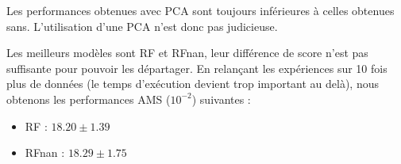\documentclass[12pt]{article}
\begin{document}
\begin{table}[H]
    \center
    \caption{Performances obtenues avec chaque méthode (avec PCA)}
    \label{tab:ensemble-results-pca}
\end{table}

Les performances obtenues avec PCA sont toujours inférieures à celles obtenues
sans.  L'utilisation d'une PCA n'est donc pas judicieuse.



Les meilleurs modèles sont RF et RFnan, leur différence de score n'est pas
suffisante pour pouvoir les départager.  En relançant les expériences sur 10
fois plus de données (le temps d'exécution devient trop important au delà), nous
obtenons les performances AMS ($10^{-2}$) suivantes :

\begin{itemize}
    \item RF :     $18.20 \pm 1.39$
    \item RFnan :  $18.29 \pm 1.75$
\end{itemize}
\end{document}
